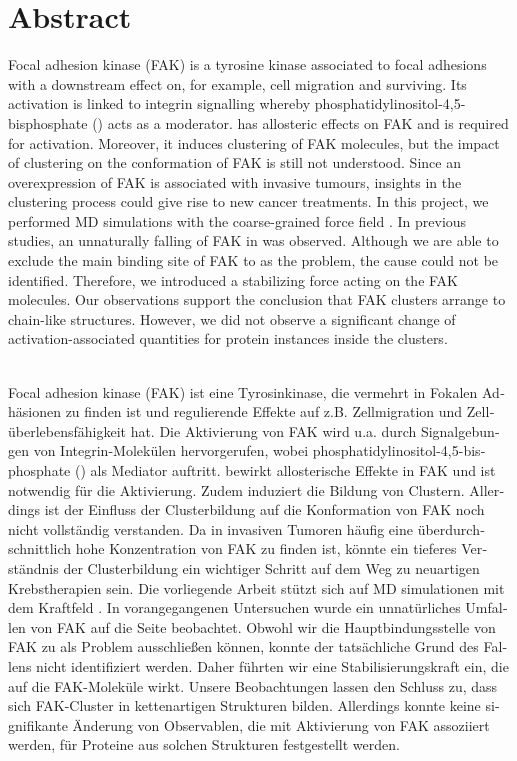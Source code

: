 \chapter*{Abstract}
Focal adhesion kinase (FAK) is a tyrosine kinase associated to focal adhesions with a downstream effect on, for example, cell migration and surviving. Its activation is linked to integrin signalling whereby phosphatidylinositol-4,5-bisphosphate (\pip) acts as a moderator. \pip{} has allosteric effects on FAK and is required for activation. Moreover, it induces clustering of FAK molecules, but the impact of clustering on the conformation of FAK is still not understood. Since an overexpression of FAK is associated with invasive tumours, insights in the clustering process could give rise to new cancer treatments. In this project, we performed MD simulations with the coarse-grained force field \martini{}. In previous studies, an unnaturally falling of FAK in \martini{} was observed. Although we are able to exclude the main binding site of FAK to \pip{} as the problem, the cause could not be identified. Therefore, we introduced a stabilizing force acting on the FAK molecules. Our observations support the conclusion that FAK clusters arrange to chain-like structures. However, we did not observe a significant change of activation-associated quantities for protein instances inside the clusters.\\
\\
\begin{german}
	Focal adhesion kinase (FAK) ist eine Tyrosinkinase, die vermehrt in Fokalen Adhäsionen zu finden ist und regulierende Effekte auf z.B. Zellmigration und Zellüberlebensfähigkeit hat. Die Aktivierung von FAK wird u.a. durch Signalgebungen von Integrin-Molekülen hervorgerufen, wobei phosphatidylinositol-4,5-bisphosphate (\pip) als Mediator auftritt. \pip{} bewirkt allosterische Effekte in FAK und ist notwendig für die Aktivierung. Zudem induziert \pip{} die Bildung von Clustern. Allerdings ist der Einfluss der Clusterbildung auf die Konformation von FAK noch nicht vollständig verstanden. Da in invasiven Tumoren häufig eine überdurchschnittlich hohe Konzentration von FAK zu finden ist, könnte ein tieferes Verständnis der Clusterbildung ein wichtiger Schritt auf dem Weg zu neuartigen Krebstherapien sein. Die vorliegende Arbeit stützt sich auf MD simulationen mit dem Kraftfeld \martini{}. In vorangegangenen Untersuchen wurde ein unnatürliches Umfallen von FAK auf die Seite beobachtet. Obwohl wir die Hauptbindungsstelle von FAK zu \pip{} als Problem ausschließen können, konnte der tatsächliche Grund des Fallens nicht identifiziert werden. Daher führten wir eine Stabilisierungskraft ein, die auf die FAK-Moleküle wirkt. Unsere Beobachtungen lassen den Schluss zu, dass sich FAK-Cluster in kettenartigen Strukturen bilden. Allerdings konnte keine signifikante Änderung von Observablen, die mit Aktivierung von FAK assoziiert werden, für Proteine aus solchen Strukturen festgestellt werden.
\end{german}
